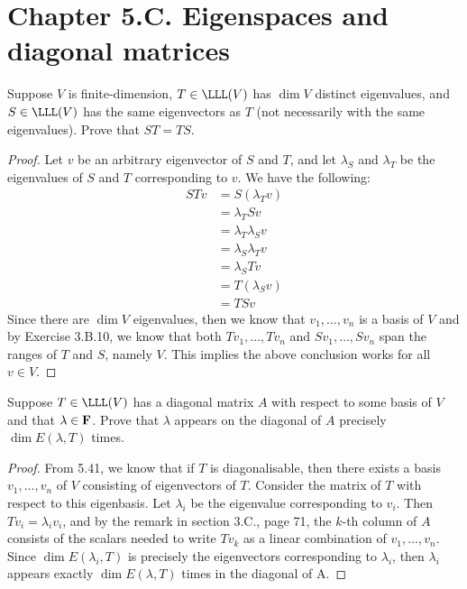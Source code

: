 \section*{Chapter 5.C. Eigenspaces and diagonal matrices}


\begin{exercise}{6}
  Suppose $V$ is finite-dimension, $T\in\LLL(V)$ has $\dim V$ distinct eigenvalues, and $S\in\LLL(V)$ has the same eigenvectors as $T$ (not necessarily with the same eigenvalues). Prove that $ST=TS$.
\end{exercise}
\begin{proof}
 Let $v$ be an arbitrary eigenvector of $S$ and $T$, and let $\lambda_S$ and $\lambda_T$ be the eigenvalues of $S$ and $T$ corresponding to $v$. We have the following:
 \begin{align*}
     STv &= S(\lambda_T v)\\
     &= \lambda_T Sv\\
     &= \lambda_T\lambda_S v\\
     &= \lambda_S\lambda_T v\\
     &= \lambda_S Tv\\
     &= T(\lambda_S v)\\
     &= TSv
 \end{align*}
 Since there are $\dim V$ eigenvalues, then we know that $v_1,\dots,v_n$ is a basis of $V$ and by Exercise 3.B.10, we know that both $Tv_1,\dots,Tv_n$ and $Sv_1,\dots,Sv_n$ span the ranges of $T$ and $S$, namely $V$. This implies the above conclusion works for all $v\in V$.
\end{proof}

\begin{exercise}{7}
  Suppose $T\in\LLL(V)$ has a diagonal matrix $A$ with respect to some basis of $V$ and that $\lambda\in\mathbf{F}$. Prove that $\lambda$ appears on the diagonal of $A$ precisely $\dim E(\lambda, T)$ times.
\end{exercise}
\begin{proof}
 From 5.41, we know that if $T$ is diagonalisable, then there exists a basis $v_1,\dots,v_n$ of $V$ consisting of eigenvectors of $T$. Consider the matrix of $T$ with respect to this eigenbasis. Let $\lambda_i$ be the eigenvalue corresponding to $v_i$. Then $Tv_i=\lambda_iv_i$, and by the remark in section 3.C., page 71, the $k$-th column of $A$ consists of the scalars needed to write $Tv_k$ as a linear combination of $v_1,\dots,v_n$. Since $\dim E(\lambda_i,T)$ is precisely the eigenvectors corresponding to $\lambda_i$, then $\lambda_i$ appears exactly $\dim E(\lambda, T)$ times in the diagonal of A.
\end{proof}

